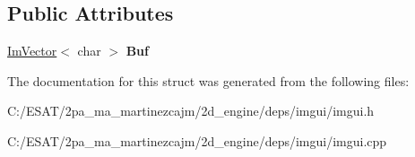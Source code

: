\subsection*{Public Attributes}
\begin{DoxyCompactItemize}
\item 
\mbox{\label{struct_im_gui_text_buffer_aa6de034b1920cdae5505cc58abf14240}} 
\hyperlink{class_im_vector}{Im\+Vector}$<$ char $>$ {\bfseries Buf}
\end{DoxyCompactItemize}


The documentation for this struct was generated from the following files\+:\begin{DoxyCompactItemize}
\item 
C\+:/\+E\+S\+A\+T/2pa\+\_\+ma\+\_\+martinezcajm/2d\+\_\+engine/deps/imgui/imgui.\+h\item 
C\+:/\+E\+S\+A\+T/2pa\+\_\+ma\+\_\+martinezcajm/2d\+\_\+engine/deps/imgui/imgui.\+cpp\end{DoxyCompactItemize}
